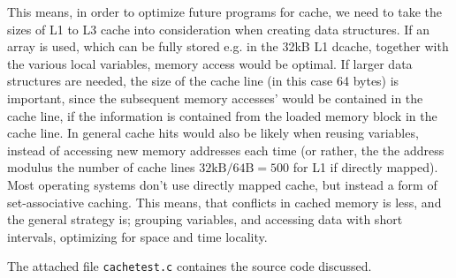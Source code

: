 This means, in order to optimize future programs for cache, we need to take the sizes of L1 to L3 cache into consideration when creating data structures. If an array is used, which can be fully stored e.g. in the 32kB L1 dcache, together with the various local variables, memory access would be optimal. If larger data structures are needed, the size of the cache line (in this case 64 bytes) is important, since the subsequent memory accesses' would be contained in the cache line, if the information is contained from the loaded memory block in the cache line. In general cache hits would also be likely when reusing variables, instead of accessing new memory addresses each time (or rather, the the address modulus the number of cache lines $32\text{kB}/64\text{B} = 500$ for L1 if directly mapped). Most operating systems don't use directly mapped cache, but instead a form of set-associative caching. This means, that conflicts in cached memory is less, and the general strategy is; grouping variables, and accessing data with short intervals, optimizing for space and time locality. 

The attached file \texttt{cachetest.c} containes the source code discussed.